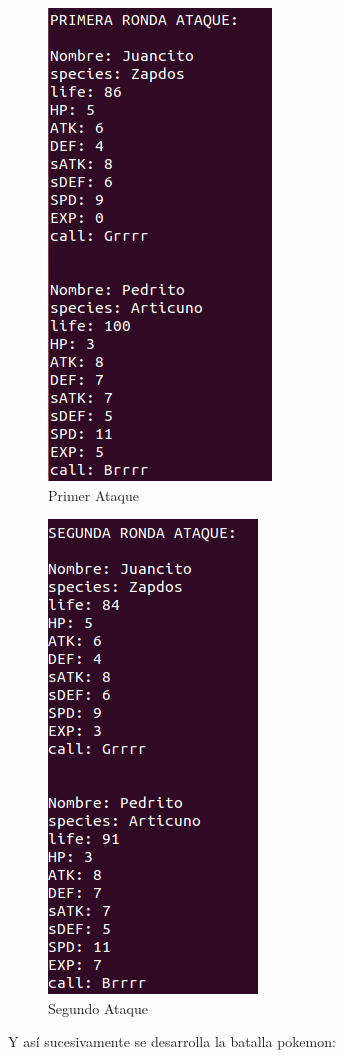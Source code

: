 \documentclass[11pt]{article}
\begin{document}
\begin{figure}[ht]
\centering
\includegraphics[scale=0.4]{estr2.png}
\caption{Primer Ataque}
\end{figure}

\begin{figure}[ht]
\centering
\includegraphics[scale=0.4]{estr3.png}
\caption{Segundo Ataque}
\end{figure}

Y así sucesivamente se desarrolla la batalla pokemon:
\end{document}

